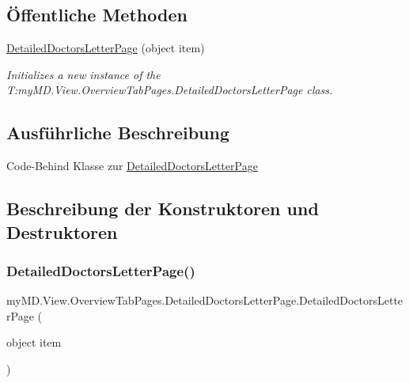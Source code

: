 \subsection*{Öffentliche Methoden}
\begin{DoxyCompactItemize}
\item 
\mbox{\hyperlink{classmy_m_d_1_1_view_1_1_overview_tab_pages_1_1_detailed_doctors_letter_page_a28245631ccc5cb7fc5e5ced0bc4d7731}{Detailed\+Doctors\+Letter\+Page}} (object item)
\begin{DoxyCompactList}\small\item\em Initializes a new instance of the T\+:my\+M\+D.\+View.\+Overview\+Tab\+Pages.\+Detailed\+Doctors\+Letter\+Page class. \end{DoxyCompactList}\end{DoxyCompactItemize}


\subsection{Ausführliche Beschreibung}
Code-\/\+Behind Klasse zur \mbox{\hyperlink{classmy_m_d_1_1_view_1_1_overview_tab_pages_1_1_detailed_doctors_letter_page}{Detailed\+Doctors\+Letter\+Page}} 



\subsection{Beschreibung der Konstruktoren und Destruktoren}
\mbox{\label{classmy_m_d_1_1_view_1_1_overview_tab_pages_1_1_detailed_doctors_letter_page_a28245631ccc5cb7fc5e5ced0bc4d7731}} 
\subsubsection{\texorpdfstring{Detailed\+Doctors\+Letter\+Page()}{DetailedDoctorsLetterPage()}}
{\footnotesize\ttfamily my\+M\+D.\+View.\+Overview\+Tab\+Pages.\+Detailed\+Doctors\+Letter\+Page.\+Detailed\+Doctors\+Letter\+Page (\begin{DoxyParamCaption}\item[{object}]{item }\end{DoxyParamCaption})}



